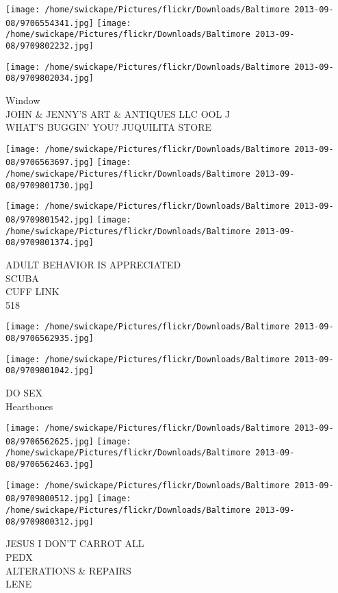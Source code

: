 \documentclass[10pt,letterpaper]{article}
\begin{document}
\texttt{[image: /home/swickape/Pictures/flickr/Downloads/Baltimore 2013-09-08/9706554341.jpg]}
\texttt{[image: /home/swickape/Pictures/flickr/Downloads/Baltimore 2013-09-08/9709802232.jpg]}

\vspace{0.25in}
\texttt{[image: /home/swickape/Pictures/flickr/Downloads/Baltimore 2013-09-08/9709802034.jpg]}

Window\\
JOHN \& JENNY'S ART \& ANTIQUES LLC OOL J\\
WHAT'S BUGGIN' YOU? JUQUILITA STORE
\pagebreak

\texttt{[image: /home/swickape/Pictures/flickr/Downloads/Baltimore 2013-09-08/9706563697.jpg]}
\texttt{[image: /home/swickape/Pictures/flickr/Downloads/Baltimore 2013-09-08/9709801730.jpg]}

\texttt{[image: /home/swickape/Pictures/flickr/Downloads/Baltimore 2013-09-08/9709801542.jpg]}
\texttt{[image: /home/swickape/Pictures/flickr/Downloads/Baltimore 2013-09-08/9709801374.jpg]}

ADULT BEHAVIOR IS APPRECIATED\\
SCUBA\\
CUFF LINK\\
518
\pagebreak

\texttt{[image: /home/swickape/Pictures/flickr/Downloads/Baltimore 2013-09-08/9706562935.jpg]}

\vspace{0.25in}
\texttt{[image: /home/swickape/Pictures/flickr/Downloads/Baltimore 2013-09-08/9709801042.jpg]}

DO SEX\\
Heartbones
\pagebreak

\texttt{[image: /home/swickape/Pictures/flickr/Downloads/Baltimore 2013-09-08/9706562625.jpg]}
\texttt{[image: /home/swickape/Pictures/flickr/Downloads/Baltimore 2013-09-08/9706562463.jpg]}

\texttt{[image: /home/swickape/Pictures/flickr/Downloads/Baltimore 2013-09-08/9709800512.jpg]}
\texttt{[image: /home/swickape/Pictures/flickr/Downloads/Baltimore 2013-09-08/9709800312.jpg]}

JESUS I DON'T CARROT ALL\\
PEDX\\
ALTERATIONS \& REPAIRS\\
LENE
\pagebreak
\end{document}
